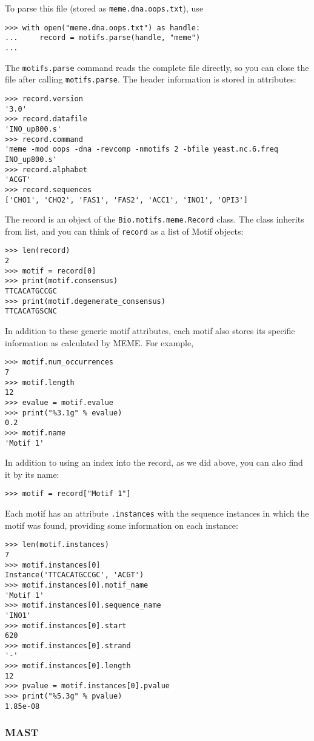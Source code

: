 To parse this file (stored as \verb+meme.dna.oops.txt+), use
\begin{verbatim}
>>> with open("meme.dna.oops.txt") as handle:
...     record = motifs.parse(handle, "meme")
...
\end{verbatim}
The \verb+motifs.parse+ command reads the complete file directly, so you can
close the file after calling \verb+motifs.parse+.
The header information is stored in attributes:
\begin{verbatim}
>>> record.version
'3.0'
>>> record.datafile
'INO_up800.s'
>>> record.command
'meme -mod oops -dna -revcomp -nmotifs 2 -bfile yeast.nc.6.freq INO_up800.s'
>>> record.alphabet
'ACGT'
>>> record.sequences
['CHO1', 'CHO2', 'FAS1', 'FAS2', 'ACC1', 'INO1', 'OPI3']
\end{verbatim}
The record is an object of the \verb+Bio.motifs.meme.Record+ class.
The class inherits from list, and you can think of \verb+record+ as a list of Motif objects:
\begin{verbatim}
>>> len(record)
2
>>> motif = record[0]
>>> print(motif.consensus)
TTCACATGCCGC
>>> print(motif.degenerate_consensus)
TTCACATGSCNC
\end{verbatim}
In addition to these generic motif attributes, each motif also stores its
specific information as calculated by MEME. For example,
\begin{verbatim}
>>> motif.num_occurrences
7
>>> motif.length
12
>>> evalue = motif.evalue
>>> print("%3.1g" % evalue)
0.2
>>> motif.name
'Motif 1'
\end{verbatim}
In addition to using an index into the record, as we did above,
you can also find it by its name:
\begin{verbatim}
>>> motif = record["Motif 1"]
\end{verbatim}
Each motif has an attribute \verb+.instances+ with the sequence instances
in which the motif was found, providing some information on each instance:
\begin{verbatim}
>>> len(motif.instances)
7
>>> motif.instances[0]
Instance('TTCACATGCCGC', 'ACGT')
>>> motif.instances[0].motif_name
'Motif 1'
>>> motif.instances[0].sequence_name
'INO1'
>>> motif.instances[0].start
620
>>> motif.instances[0].strand
'-'
>>> motif.instances[0].length
12
>>> pvalue = motif.instances[0].pvalue
>>> print("%5.3g" % pvalue)
1.85e-08
\end{verbatim}

\subsubsection*{MAST}


